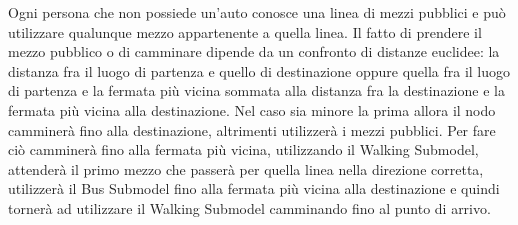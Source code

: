 Ogni persona che non possiede un'auto conosce una linea di mezzi pubblici e può utilizzare qualunque mezzo appartenente a quella linea. Il fatto di prendere il mezzo pubblico o di camminare dipende da un confronto di distanze euclidee: la distanza fra il luogo di partenza e quello di destinazione oppure quella fra il luogo di partenza e la fermata più vicina sommata alla distanza fra la destinazione e la fermata più vicina alla destinazione. Nel caso sia minore la prima allora il nodo camminerà fino alla destinazione, altrimenti utilizzerà i mezzi pubblici. Per fare ciò camminerà fino alla fermata più vicina, utilizzando il Walking Submodel, attenderà il primo mezzo che passerà per quella linea nella direzione corretta, utilizzerà il Bus Submodel fino alla fermata più vicina alla destinazione e quindi tornerà ad utilizzare il Walking Submodel camminando fino al punto di arrivo.
 

